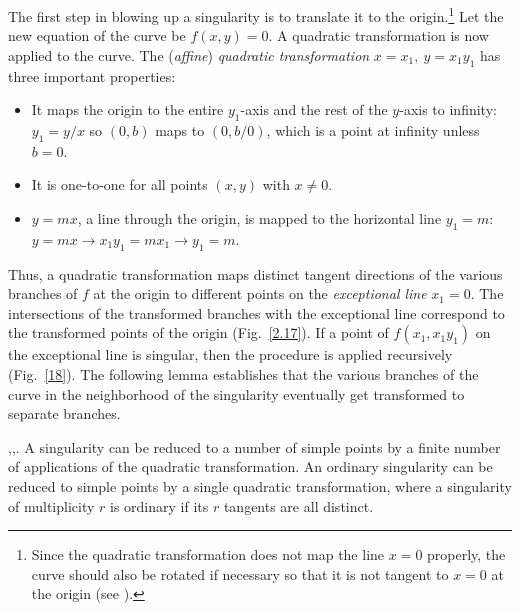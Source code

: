 The first step in blowing up a singularity is to translate it to the 
origin.\footnote{Since the quadratic transformation does not map the line $x=0$ 
	properly, the curve should also be rotated if necessary so that it is 
	not tangent to $x=0$ at the origin (see \cite{jj}).}
Let the new equation of the curve be $f(x,y)=0$.
A quadratic transformation is now applied to the curve.
The ({\em affine}) {\em quadratic transformation} $x = x_{1},\ y = x_{1}y_{1}$
\cite{abhy} has three important properties:
\begin{itemize}
\item
It maps the origin to the entire $y_{1}$-axis and the rest of 
the $y$-axis to infinity: $y_{1} = y/x$ so $(0,b)$ maps to 
$(0,b/0)$, which is a point at infinity unless $b=0$.
\item
It is one-to-one for all points $(x,y)$ with $x \neq 0$.
\item
$y = mx$, a line  through the origin, is mapped to the horizontal line $y_{1}=m$:\\
$y=mx \rightarrow  x_{1}y_{1} = mx_{1}  \rightarrow  y_{1}=m$.
\end{itemize}


\noindent Thus, a quadratic transformation maps distinct tangent directions of the
various branches of $f$ at the origin to different points on the 
{\em exceptional line} $x_{1} =0$.
The intersections of the transformed branches with the exceptional line
correspond to the transformed points of the origin (Fig.~\ref{2.17}).
If a point of $f(x_{1},x_{1}y_{1})$ on the exceptional line is singular, 
then the procedure is applied recursively (Fig.~\ref{18}).
The following lemma establishes that the various branches of the curve 
in the neighborhood of the singularity eventually get transformed to separate 
branches.

\begin{lemma}
{\rm \cite{abhy},\cite{abba3},\cite{walker}}.
A singularity can be reduced to a number of simple points by 
a finite number of applications of the quadratic transformation.
An ordinary singularity can be reduced to simple points by a 
single quadratic transformation, where a singularity of multiplicity 
$r$ is ordinary if its $r$ tangents are all distinct.
\end{lemma}

